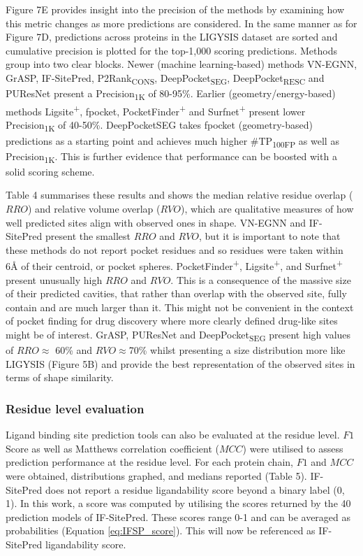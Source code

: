 Figure 7E provides insight into the precision of the methods by examining how this metric changes as more predictions are considered. In the same manner as for Figure 7D, predictions across proteins in the LIGYSIS dataset are sorted and cumulative precision is plotted for the top-1,000 scoring predictions. Methods group into two clear blocks. Newer (machine learning-based) methods VN-EGNN, GrASP, IF-SitePred, P2Rank\textsubscript{CONS}, DeepPocket\textsubscript{SEG}, DeepPocket\textsubscript{RESC} and PUResNet present a Precision\textsubscript{1K} of 80-95\%. Earlier (geometry/energy-based) methods Ligsite\textsuperscript{+}, fpocket, PocketFinder\textsuperscript{+} and Surfnet\textsuperscript{+} present lower Precision\textsubscript{1K} of 40-50\%. DeepPocketSEG takes fpocket (geometry-based) predictions as a starting point and achieves much higher \#TP\textsubscript{100FP} as well as Precision\textsubscript{1K}. This is further evidence that performance can be boosted with a solid scoring scheme.

Table 4 summarises these results and shows the median relative residue overlap ($RRO$) and relative volume overlap ($RVO$), which are qualitative measures of how well predicted sites align with observed ones in shape. VN-EGNN and IF-SitePred present the smallest $RRO$ and $RVO$, but it is important to note that these methods do not report pocket residues and so residues were taken within 6Å of their centroid, or pocket spheres. PocketFinder\textsuperscript{+}, Ligsite\textsuperscript{+}, and Surfnet\textsuperscript{+} present unusually high $RRO$ and $RVO$. This is a consequence of the massive size of their predicted cavities, that rather than overlap with the observed site, fully contain and are much larger than it. This might not be convenient in the context of pocket finding for drug discovery where more clearly defined drug-like sites might be of interest. GrASP, PUResNet and DeepPocket\textsubscript{SEG} present high values of $RRO \approx$ 60\% and $RVO \approx $70\% whilst presenting a size distribution more like LIGYSIS (Figure 5B) and provide the best representation of the observed sites in terms of shape similarity.

\subsubsection{Residue level evaluation}

Ligand binding site prediction tools can also be evaluated at the residue level. $F1$ Score as well as Matthews correlation coefficient ($MCC$) were utilised to assess prediction performance at the residue level. For each protein chain, $F1$ and $MCC$ were obtained, distributions graphed, and medians reported (Table 5). IF-SitePred does not report a residue ligandability score beyond a binary label (0, 1). In this work, a score was computed by utilising the scores returned by the 40 prediction models of IF-SitePred. These scores range 0-1 and can be averaged as probabilities (Equation \ref{eq:IFSP_score}). This will now be referenced as IF-SitePred ligandability score.

